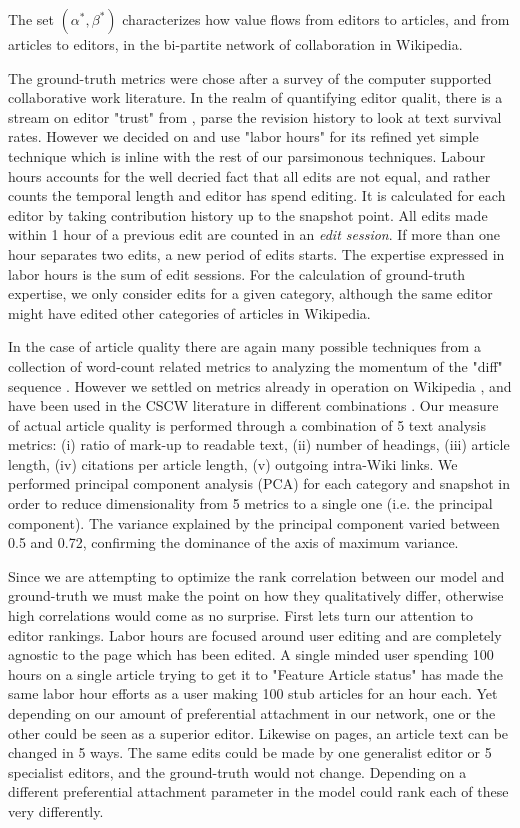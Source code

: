 The set $(\alpha^*,\beta^*)$ characterizes how value flows from editors to articles, and from articles to editors, in the bi-partite network of collaboration in Wikipedia.

The ground-truth metrics were chose after a survey of the computer supported collaborative work literature. In the realm of quantifying editor qualit, there is a stream on editor "trust" from \cite{adler07} \cite{adler08} \cite{zeng}, parse the revision history to look at text survival rates. However we decided on \cite{geiger2013} and use "labor hours" for its refined yet simple technique which is inline with the rest of our parsimonous techniques. Labour hours accounts for the well decried fact that all edits are not equal, and rather counts the temporal length and editor has spend editing. It is calculated for each editor by taking contribution history up to the snapshot point. All edits made within 1 hour of a previous edit are counted in an {\it edit session}. If more than one hour separates two edits, a new period of edits  starts. The expertise expressed in labor hours is the sum of edit sessions. For the calculation of ground-truth expertise, we only consider edits for a given category, although the same editor might have edited other categories of articles in Wikipedia. 

In the case of article quality there are again many possible techniques from a collection of word-count related metrics \cite{blumenstock} to analyzing the momentum of the "diff" sequence \cite{wohner}. However we settled on metrics already in operation on Wikipedia \cite{wang2013tell} \cite{klein}, and have been used in the CSCW literature in different combinations \cite{kane2011} \cite{keegan2012}. Our measure of actual article quality is performed through a combination of 5 text analysis metrics: (i) ratio of mark-up to readable text, (ii) number of headings, (iii) article length, (iv) citations per article length, (v) outgoing intra-Wiki links. We performed principal component analysis (PCA) for each category and snapshot in order to reduce dimensionality from 5 metrics to a single one (i.e. the principal component). The variance explained by the principal component varied between 0.5 and 0.72, confirming the dominance of the axis of maximum variance.

Since we are attempting to optimize the rank correlation between our model and ground-truth we must make the point on how they qualitatively differ, otherwise high correlations would come as no surprise. First lets turn our attention to editor rankings. Labor hours are focused around user editing and are completely agnostic to the page which has been edited. A single minded user spending 100 hours on a single article trying to get it to "Feature Article status" has made the same labor hour efforts as a user making 100 stub articles for an hour each. Yet depending on our amount of preferential attachment in our network, one or the other could be seen as a superior editor. Likewise on pages, an article text can be changed in 5 ways. The same edits could be made by one generalist editor or 5 specialist editors, and the ground-truth would not change. Depending on a different preferential attachment parameter in the model could rank each of these very differently.

